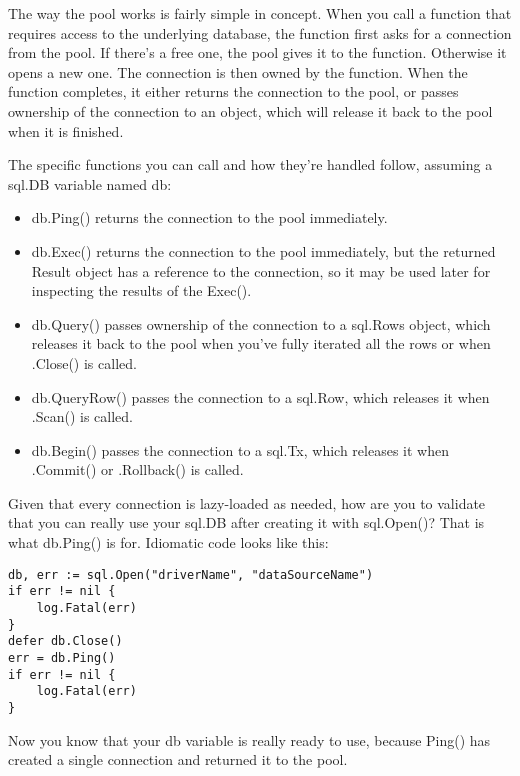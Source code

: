 \documentclass{vivid_layout}
\begin{document}
The way the pool works is fairly simple in concept. When you call
a function that requires access to the underlying database, the function first asks for a connection from the pool. If there’s a free one, the pool gives it to the function. Otherwise it opens a new one. The connection is then owned by the function. When the function completes, it either returns the connection to the pool, or passes ownership of the connection to an object, which will release it back to the pool when it is finished.

The specific functions you can call and how they’re handled follow, assuming a sql.DB variable named db:

\begin{itemize}

	\item db.Ping() returns the connection to the pool immediately.

	\item db.Exec() returns the connection to the pool immediately, but the returned Result object has a reference to the connection, so it may be used later for inspecting the results of the Exec().

	\item db.Query() passes ownership of the connection to a sql.Rows object, which releases it back to the pool when you’ve fully iterated all the rows or when .Close() is called.

	\item db.QueryRow() passes the connection to a sql.Row, which releases it when .Scan() is called.

	\item db.Begin() passes the connection to a sql.Tx, which releases it when .Commit() or .Rollback() is called.

\end{itemize}

Given that every connection is lazy-loaded as needed, how are you to validate that you can really use your sql.DB after creating it with sql.Open()? That is what db.Ping() is for. Idiomatic code looks like this:

\begin{verbatim}
db, err := sql.Open("driverName", "dataSourceName")
if err != nil {
    log.Fatal(err)
}
defer db.Close()
err = db.Ping()
if err != nil {
    log.Fatal(err)
}
\end{verbatim}

Now you know that your db variable is really ready to use, because Ping() has created a single connection and returned it to the pool.
\end{document}
